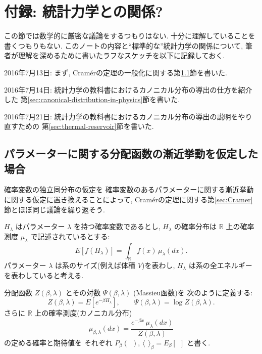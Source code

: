 \documentclass[12pt,twoside]{jarticle}
\newcommand\R{{\mathbb R}} %
\newcommand\bra{\langle}
\newcommand\ket{\rangle}
\theoremstyle{jplain}
\theoremstyle{jplain}
\theoremstyle{jplain}
\numberwithin{theorem}{section}
\numberwithin{equation}{section}
\numberwithin{figure}{section}
\numberwithin{table}{section}
\newcommand\secref[1]{第\ref{#1}節}
\begin{document}

\section{付録: 統計力学との関係?}
\label{sec:statistical-mechanics}

この節では数学的に厳密な議論をするつもりはない.
十分に理解していることを書くつもりもない.
このノートの内容と``標準的な''統計力学の関係について, 
筆者が理解を深めるために書いたラフなスケッチを以下に記録しておく.

2016年7月13日: 
まず, Cram\'erの定理の一般化に関する\secref{sec:generalized-Cramer}を書いた.

2016年7月14日: 
統計力学の教科書におけるカノニカル分布の導出の仕方を紹介した
\secref{sec:canonical-distribution-in-physics}を書いた.

2016年7月21日:
統計力学の教科書におけるカノニカル分布の導出の説明をやり直すための
\secref{sec:thermal-reservoir}を書いた.


\subsection{パラメーターに関する分配函数の漸近挙動を仮定した場合}
\label{sec:generalized-Cramer}

確率変数の独立同分布の仮定を
確率変数のあるパラメーターに関する漸近挙動に関する仮定に置き換えることによって, 
Cram\'erの定理に関する\secref{sec:Cramer}とほぼ同じ議論を繰り返そう.

$H_\lambda$ はパラメーター $\lambda$ を持つ確率変数であるとし,
$H_\lambda$ の確率分布は $\R$ 上の確率測度 $\mu_\lambda$ で記述されているとする:
\[
E[f(H_\lambda)] = \int_\R f(x)\,\mu_\lambda(dx).
\]
パラメーター $\lambda$ は系のサイズ(例えば体積 $V$)を表わし, 
$H_\lambda$ は系の全エネルギーを表わしていると考える.

分配函数 $Z(\beta,\lambda)$ とその対数 $\Psi(\beta,\lambda)$ (Massieu函数)を
次のように定義する:
\[
Z(\beta,\lambda)=E[e^{-\beta H_\lambda}], \qquad
\Psi(\beta,\lambda)=\log Z(\beta,\lambda).
\]
さらに $\R$ 上の確率測度(カノニカル分布)
\[
\mu_{\beta,\lambda}(dx)=\frac{e^{-\beta x}\,\mu_\lambda(dx)}{Z(\beta,\lambda)}
\]
の定める確率と期待値を
それぞれ $P_\beta(\ \ )$, $\bra\ \ \ket_\beta=E_\beta[\ \ ]$ と書く.
\end{document}
